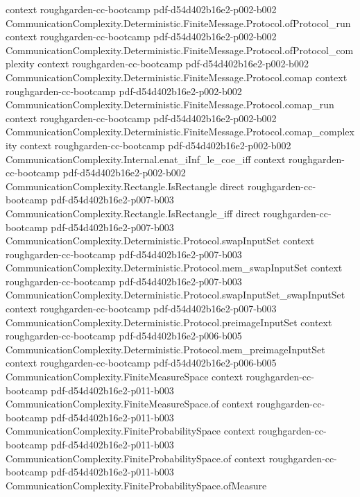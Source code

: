 \begin{theorem}
  {context}
  {roughgarden-cc-bootcamp}
  {pdf-d54d402b16e2-p002-b002}
\proofstep
  {CommunicationComplexity.Deterministic.FiniteMessage.Protocol.ofProtocol_run}
  {context}
  {roughgarden-cc-bootcamp}
  {pdf-d54d402b16e2-p002-b002}
\proofstep
  {CommunicationComplexity.Deterministic.FiniteMessage.Protocol.ofProtocol_complexity}
  {context}
  {roughgarden-cc-bootcamp}
  {pdf-d54d402b16e2-p002-b002}
\proofstep
  {CommunicationComplexity.Deterministic.FiniteMessage.Protocol.comap}
  {context}
  {roughgarden-cc-bootcamp}
  {pdf-d54d402b16e2-p002-b002}
\proofstep
  {CommunicationComplexity.Deterministic.FiniteMessage.Protocol.comap_run}
  {context}
  {roughgarden-cc-bootcamp}
  {pdf-d54d402b16e2-p002-b002}
\proofstep
  {CommunicationComplexity.Deterministic.FiniteMessage.Protocol.comap_complexity}
  {context}
  {roughgarden-cc-bootcamp}
  {pdf-d54d402b16e2-p002-b002}
\proofstep
  {CommunicationComplexity.Internal.enat_iInf_le_coe_iff}
  {context}
  {roughgarden-cc-bootcamp}
  {pdf-d54d402b16e2-p002-b002}
\proofstep
  {CommunicationComplexity.Rectangle.IsRectangle}
  {direct}
  {roughgarden-cc-bootcamp}
  {pdf-d54d402b16e2-p007-b003}
\proofstep
  {CommunicationComplexity.Rectangle.IsRectangle_iff}
  {direct}
  {roughgarden-cc-bootcamp}
  {pdf-d54d402b16e2-p007-b003}
\proofstep
  {CommunicationComplexity.Deterministic.Protocol.swapInputSet}
  {context}
  {roughgarden-cc-bootcamp}
  {pdf-d54d402b16e2-p007-b003}
\proofstep
  {CommunicationComplexity.Deterministic.Protocol.mem_swapInputSet}
  {context}
  {roughgarden-cc-bootcamp}
  {pdf-d54d402b16e2-p007-b003}
\proofstep
  {CommunicationComplexity.Deterministic.Protocol.swapInputSet_swapInputSet}
  {context}
  {roughgarden-cc-bootcamp}
  {pdf-d54d402b16e2-p007-b003}
\proofstep
  {CommunicationComplexity.Deterministic.Protocol.preimageInputSet}
  {context}
  {roughgarden-cc-bootcamp}
  {pdf-d54d402b16e2-p006-b005}
\proofstep
  {CommunicationComplexity.Deterministic.Protocol.mem_preimageInputSet}
  {context}
  {roughgarden-cc-bootcamp}
  {pdf-d54d402b16e2-p006-b005}
\proofstep
  {CommunicationComplexity.FiniteMeasureSpace}
  {context}
  {roughgarden-cc-bootcamp}
  {pdf-d54d402b16e2-p011-b003}
\proofstep
  {CommunicationComplexity.FiniteMeasureSpace.of}
  {context}
  {roughgarden-cc-bootcamp}
  {pdf-d54d402b16e2-p011-b003}
\proofstep
  {CommunicationComplexity.FiniteProbabilitySpace}
  {context}
  {roughgarden-cc-bootcamp}
  {pdf-d54d402b16e2-p011-b003}
\proofstep
  {CommunicationComplexity.FiniteProbabilitySpace.of}
  {context}
  {roughgarden-cc-bootcamp}
  {pdf-d54d402b16e2-p011-b003}
\proofstep
  {CommunicationComplexity.FiniteProbabilitySpace.ofMeasure}

\end{theorem}
